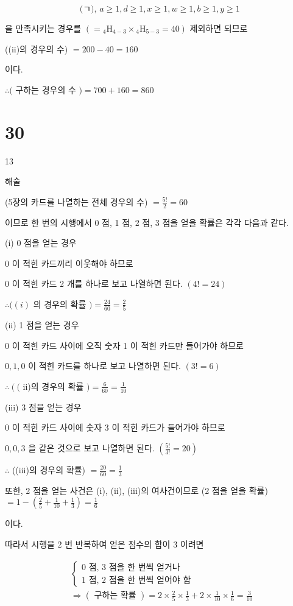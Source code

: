 \documentclass[10pt]{article}
\begin{document}
\[
\text { (ㄱ), } a \geq 1, d \geq 1, x \geq 1, w \geq 1, b \geq 1, y \geq 1
\]

을 만족시키는 경우를 \(\left(={ }_{4} \mathrm{H}_{4-3} \times{ }_{4} \mathrm{H}_{5-3}=40\right)\) 제외하면 되므로

((ii)의 경우의 수) \(=200-40=160\)

이다.

\(\therefore(\) 구하는 경우의 수 \()=700+160=860\)

\section*{30}
13

해술

(5장의 카드를 나열하는 전체 경우의 수) \(=\frac{5!}{2}=60\)

이므로 한 번의 시행에서 0 점, 1 점, 2 점, 3 점을 얻을 확률은 각각 다음과 같다.

(i) 0 점을 얻는 경우

0 이 적힌 카드끼리 이웃해야 하므로

0 이 적힌 카드 2 개를 하나로 보고 나열하면 된다. \((4!=24)\)

\(\therefore((i)\) 의 경우의 확률 \()=\frac{24}{60}=\frac{2}{5}\)

(ii) 1 점을 얻는 경우

0 이 적힌 카드 사이에 오직 숫자 1 이 적힌 카드만 들어가야 하므로

\(0,1,0\) 이 적힌 카드를 하나로 보고 나열하면 된다. \((3!=6)\)

\(\therefore\left((\right.\) ii)의 경우의 확률 \()=\frac{6}{60}=\frac{1}{10}\)

(iii) 3 점을 얻는 경우

0 이 적힌 카드 사이에 숫자 3 이 적힌 카드가 들어가야 하므로

\(0,0,3\) 을 같은 것으로 보고 나열하면 된다. \(\left(\frac{5!}{3!}=20\right)\)

\(\therefore\) ((iii)의 경우의 확률) \(=\frac{20}{60}=\frac{1}{3}\)

또한, 2 점을 얻는 사건은 (i), (ii), (iii)의 여사건이므로 (2 점을 얻을 확률) \(=1-\left(\frac{2}{5}+\frac{1}{10}+\frac{1}{3}\right)=\frac{1}{6}\)

이다.

따라서 시행을 2 번 반복하여 얻은 점수의 합이 3 이려면

\[
\begin{aligned}
& \left\{\begin{array}{l}
0 \text { 점, } 3 \text { 점을 한 번씩 얻거나 } \\
1 \text { 점, } 2 \text { 점을 한 번씩 얻어야 함 }
\end{array}\right. \\
& \Rightarrow(\text { 구하는 확률 })=2 \times \frac{2}{5} \times \frac{1}{3}+2 \times \frac{1}{10} \times \frac{1}{6}=\frac{3}{10}
\end{aligned}
\]
\end{document}
